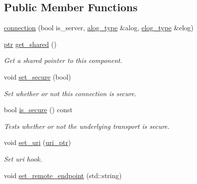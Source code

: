 \subsection*{Public Member Functions}
\begin{DoxyCompactItemize}
\item 
\hyperlink{classwebsocketpp_1_1transport_1_1debug_1_1connection_aebfb59b75e4beecf743f9f6f6cc599ff}{connection} (bool is\+\_\+server, \hyperlink{classwebsocketpp_1_1transport_1_1debug_1_1connection_a4041875e69d6a33ed4f27055fd9d6409}{alog\+\_\+type} \&alog, \hyperlink{classwebsocketpp_1_1transport_1_1debug_1_1connection_a38501811c59ca185f0dde7fa7fa8486f}{elog\+\_\+type} \&elog)
\item 
\hyperlink{classwebsocketpp_1_1transport_1_1debug_1_1connection_a40631f93557c3308c2c8c7897e6a4825}{ptr} \hyperlink{classwebsocketpp_1_1transport_1_1debug_1_1connection_a100e8592dd57f19971d933b2b47ef820}{get\+\_\+shared} ()
\begin{DoxyCompactList}\small\item\em Get a shared pointer to this component. \end{DoxyCompactList}\item 
void \hyperlink{classwebsocketpp_1_1transport_1_1debug_1_1connection_a70244283cf80113e73f6dda8c1a2c4be}{set\+\_\+secure} (bool)
\begin{DoxyCompactList}\small\item\em Set whether or not this connection is secure. \end{DoxyCompactList}\item 
bool \hyperlink{classwebsocketpp_1_1transport_1_1debug_1_1connection_ad01bd7fe663fc96a7ad18354677f0269}{is\+\_\+secure} () const 
\begin{DoxyCompactList}\small\item\em Tests whether or not the underlying transport is secure. \end{DoxyCompactList}\item 
void \hyperlink{classwebsocketpp_1_1transport_1_1debug_1_1connection_a30a06b3bfd0bd2b61822724c99911f1c}{set\+\_\+uri} (\hyperlink{namespacewebsocketpp_aae370ea5ac83a8ece7712cb39fc23f5b}{uri\+\_\+ptr})
\begin{DoxyCompactList}\small\item\em Set uri hook. \end{DoxyCompactList}\item 
void \hyperlink{classwebsocketpp_1_1transport_1_1debug_1_1connection_a3c0a3a5bc888a570c287190d299cf276}{set\+\_\+remote\+\_\+endpoint} (std\+::string)

\end{DoxyCompactItemize}
